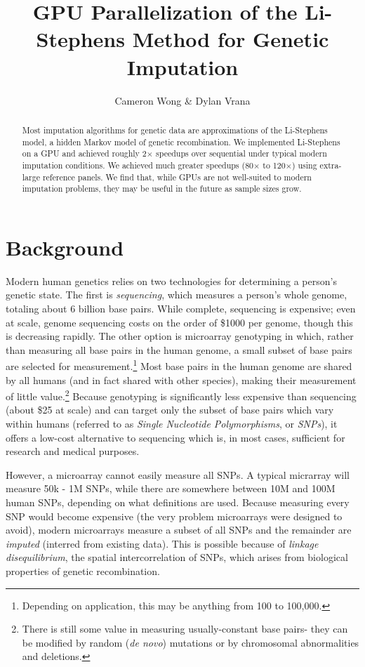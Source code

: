 \documentclass[12pt]{article}
\title{GPU Parallelization of the Li-Stephens Method for Genetic Imputation}
\author{Cameron Wong \& Dylan Vrana}
\begin{document}
\maketitle

\begin{abstract}

Most imputation algorithms for genetic data are approximations of the Li-Stephens model, a hidden Markov model of genetic recombination.   We implemented Li-Stephens on a GPU and achieved roughly 2$\times$ speedups over sequential under typical modern imputation conditions.  We achieved much greater speedups (80$\times$ to 120$\times$) using extra-large reference panels.  We find that, while GPUs are not well-suited to modern imputation problems, they may be useful in the future as sample sizes grow.

\end{abstract}

\section{Background}

Modern human genetics relies on two technologies for determining a person's genetic state.  The first is \textit{sequencing}, which measures a person's whole genome, totaling about 6 billion base pairs.  While complete, sequencing is expensive; even at scale, genome sequencing costs on the order of \$1000 per genome, though this is decreasing rapidly.  The other option is microarray genotyping in which, rather than measuring all base pairs in the human genome, a small subset of base pairs are selected for measurement.\footnote{Depending on application, this may be anything from 100 to 100,000.}  Most base pairs in the human genome are shared by all humans (and in fact shared with other species), making their measurement of little value.\footnote{There is still some value in measuring usually-constant base pairs- they can be modified by random (\textit{de novo}) mutations or by chromosomal abnormalities and deletions.}  Because genotyping is significantly less expensive than sequencing (about \$25 at scale) and can target only the subset of base pairs which vary within humans (referred to as \textit{Single Nucleotide Polymorphisms}, or \textit{SNPs}), it offers a low-cost alternative to sequencing which is, in most cases, sufficient for research and medical purposes.

However, a microarray cannot easily measure all SNPs.  A typical micrarray will measure 50k - 1M SNPs, while there are somewhere between 10M and 100M human SNPs, depending on what definitions are used.  Because measuring every SNP would become expensive (the very problem microarrays were designed to avoid), modern microarrays measure a subset of all SNPs and the remainder are \textit{imputed} (interred from existing data).  This is possible because of \textit{linkage disequilibrium}, the spatial intercorrelation of SNPs, which arises from biological properties of genetic recombination.
\end{document}
